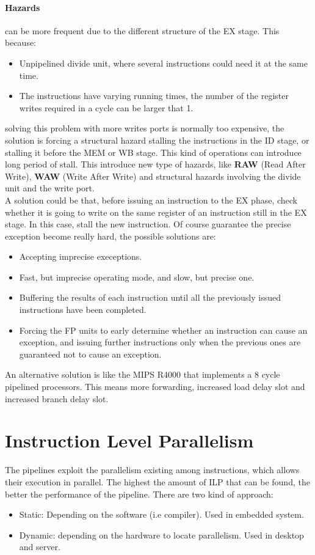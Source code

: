 \documentclass[12pt]{article}
\begin{document}
\paragraph{Hazards} can be more frequent due to the different structure of the EX stage. This because:
\begin{itemize}
  \item Unpipelined divide unit, where several instructions could need it at the same time.
  \item The instructions have varying running times, the number of the register writes required in a cycle can be larger that 1.
\end{itemize}
solving this problem with more writes ports is normally too expensive, the solution is forcing a structural hazard stalling the instructions in the ID stage, or stalling it before the MEM or WB stage. This kind of operations can introduce long period of stall. This introduce new type of hazards, like \textbf{RAW} (Read After Write), \textbf{WAW} (Write After Write) and  structural hazards involving the divide unit and the write port.\\
A solution could be that, before issuing an instruction to the EX phase, check whether it is going to write on the same register of an instruction still in the EX stage. In this case, stall the new instruction. Of course guarantee the precise exception become really hard, the possible solutions are:
\begin{itemize}
  \item Accepting imprecise execeptions.
  \item Fast, but imprecise operating mode, and slow, but precise one.
  \item Buffering the results of each instruction until all the previously issued instructions have been completed.
  \item Forcing the FP units to early determine whether an instruction can cause an exception, and issuing further instructions only when the previous ones are guaranteed not to cause an exception.
\end{itemize}
An alternative solution is like the MIPS R4000 that implements a 8 cycle pipelined processors. This means more forwarding, increased load delay slot and increased branch delay slot.

\section{Instruction Level Parallelism}
The pipelines exploit the parallelism existing among instructions, which allows their execution in parallel. The highest the amount of ILP that can be found, the better the performance of the pipeline. There are two kind of approach:
\begin{itemize}
  \item Static: Depending on the software (i.e compiler). Used in embedded system.
  \item Dynamic: depending on the hardware to locate parallelism. Used in desktop and server.
\end{itemize}
\end{document}
